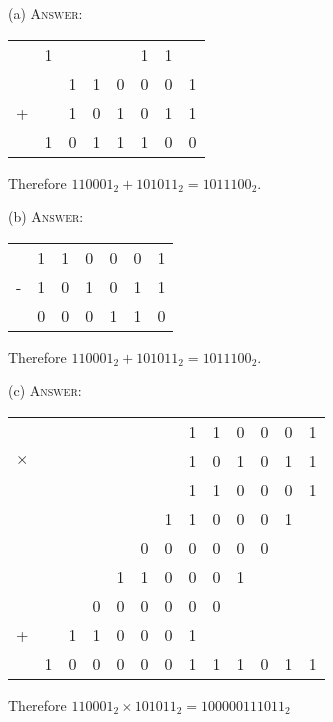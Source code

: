 
(a)
\textsc{Answer:}\vspace{-2mm}
\begin{answerlong}
\begin{longtable}{cccccccc}
    & 1 &   &   &   & 1 & 1 &   \\
    &   & 1 & 1 & 0 & 0 & 0 & 1 \\
+   &   & 1 & 0 & 1 & 0 & 1 & 1 \\\hline
    & 1 & 0 & 1 & 1 & 1 & 0 & 0 \\\hline
\end{longtable}
Therefore $110001_{2} + 101011_{2} = 1011100_{2}$.
\end{answerlong}
  
(b)
\textsc{Answer:}\vspace{-2mm}
\begin{answerlong}
\begin{longtable}{ccccccc}
    & 1 & 1 & 0 & 0 & 0 & 1 \\
-   & 1 & 0 & 1 & 0 & 1 & 1 \\\hline
    & 0 & 0 & 0 & 1 & 1 & 0 \\\hline
\end{longtable}
Therefore $110001_{2} + 101011_{2} = 1011100_{2}$.
\end{answerlong}

(c)
\textsc{Answer:}\vspace{-2mm}
\begin{answerlong}
\begin{longtable}{ccccccccccccc}
          &   &   &   &   &   &   & 1 & 1 & 0 & 0 & 0 & 1 \\
$\times$  &   &   &   &   &   &   & 1 & 0 & 1 & 0 & 1 & 1 \\ \hline
          &   &   &   &   &   &   & 1 & 1 & 0 & 0 & 0 & 1 \\
          &   &   &   &   &   & 1 & 1 & 0 & 0 & 0 & 1 &   \\
          &   &   &   &   & 0 & 0 & 0 & 0 & 0 & 0 &   &   \\
          &   &   &   & 1 & 1 & 0 & 0 & 0 & 1 &   &   &   \\ \hline
          &   &   & 0 & 0 & 0 & 0 & 0 & 0 &   &   &   &   \\
+         &   & 1 & 1 & 0 & 0 & 0 & 1 &   &   &   &   &   \\\hline
          & 1 & 0 & 0 & 0 & 0 & 0 & 1 & 1 & 1 & 0 & 1 & 1 \\ \hline
\end{longtable}
Therefore $110001_{2} \times 101011_{2} = 100000111011_{2}$
\end{answerlong}
